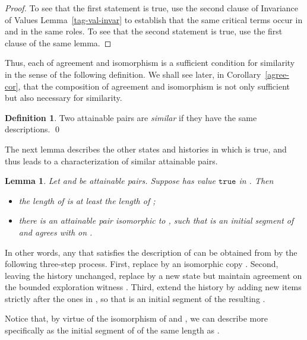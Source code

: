 \documentclass{LMCS}
\newtheorem{la}[thm]{Lemma}
\theoremstyle{definition}
\newtheorem{df}[thm]{Definition}
\newcommand{\ttt}[1]{\ensuremath{\mathtt {#1}}}
\begin{document}
\begin{proof} To see that the first statement is true, use the second
  clause of Invariance of Values Lemma~\ref{tag-val-invar} to
  establish that the same critical terms occur in
 and  in the same roles. To see that the
second statement is true, use the first clause of the same lemma.
\end{proof}

Thus, each of agreement and isomorphism is a sufficient condition for
similarity in the sense of the following definition.  We shall see
later, in Corollary~\ref{agree-cor}, that the composition of agreement
and isomorphism is not only sufficient but also necessary for
similarity.

\begin{df} Two attainable pairs are \emph{similar} if they have the
  same descriptions.
\qed\end{df}

 The next lemma describes the other states and histories in which
 is true, and thus leads to a characterization of
similar attainable pairs.

\begin{la}   \label{agree-la}
Let  and  be attainable pairs.  Suppose
 has value \ttt{true} in .  Then
\begin{itemize}
\item the length of  is at least the length of ;
\item there is an attainable pair  isomorphic to ,
  such that  is an initial segment of  and 
  agrees with  on .
\end{itemize}
\end{la}

In other words, any  that satisfies the description of
 can be obtained from  by the following three-step
process.  First, replace  by an isomorphic copy .
Second, leaving the history  unchanged, replace  by a new
state  but maintain agreement on the bounded exploration witness
.  Third, extend the history  by adding new items strictly
after the ones in , so that  is an initial segment of
the resulting .

Notice that, by virtue of the isomorphism of  and
, we can describe  more specifically as the initial
segment of  of the same length as .
\end{document}
